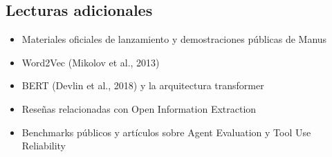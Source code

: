 \subsection{Lecturas adicionales}

\begin{itemize}
    \item Materiales oficiales de lanzamiento y demostraciones públicas de Manus
    \item Word2Vec (Mikolov et al., 2013)
    \item BERT (Devlin et al., 2018) y la arquitectura transformer
    \item Reseñas relacionadas con Open Information Extraction
    \item Benchmarks públicos y artículos sobre Agent Evaluation y Tool Use Reliability
\end{itemize}



